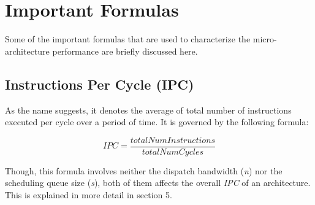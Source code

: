 \section{Important Formulas}
Some of the important formulas that are used to characterize the micro-architecture performance are briefly discussed here.

\subsection{Instructions Per Cycle (IPC)}
As the name suggests, it denotes the average of total number of instructions executed per cycle over a period of time. It is governed by the following formula:

\[IPC = \frac{totalNumInstructions}{totalNumCycles}\]

Though, this formula involves neither the dispatch bandwidth (\textit{n}) nor the scheduling queue size (\textit{s}), both of them affects the overall \textit{IPC} of an architecture. This is explained in more detail in section 5.
